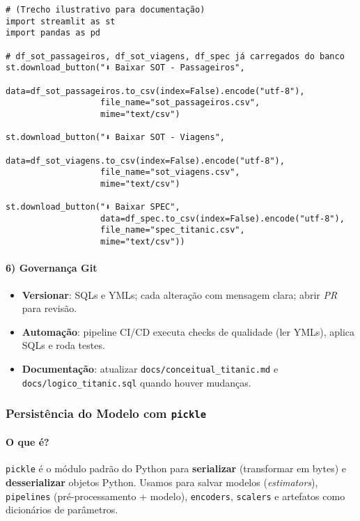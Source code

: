 \documentclass[12pt,a4paper]{article}
\begin{document}
\begin{verbatim}
# (Trecho ilustrativo para documentação)
import streamlit as st
import pandas as pd

# df_sot_passageiros, df_sot_viagens, df_spec já carregados do banco
st.download_button("⬇️ Baixar SOT - Passageiros",
                   data=df_sot_passageiros.to_csv(index=False).encode("utf-8"),
                   file_name="sot_passageiros.csv",
                   mime="text/csv")

st.download_button("⬇️ Baixar SOT - Viagens",
                   data=df_sot_viagens.to_csv(index=False).encode("utf-8"),
                   file_name="sot_viagens.csv",
                   mime="text/csv")

st.download_button("⬇️ Baixar SPEC",
                   data=df_spec.to_csv(index=False).encode("utf-8"),
                   file_name="spec_titanic.csv",
                   mime="text/csv"))
\end{verbatim}

\paragraph{6) Governança Git}
\begin{itemize}
  \item \textbf{Versionar}: SQLs e YMLs; cada alteração com mensagem clara; abrir \textit{PR} para revisão.
  \item \textbf{Automação}: pipeline CI/CD executa checks de qualidade (ler YMLs), aplica SQLs e roda testes.
  \item \textbf{Documentação}: atualizar \texttt{docs/conceitual\_titanic.md} e \texttt{docs/logico\_titanic.sql} quando houver mudanças.
\end{itemize}



\subsubsection*{Persistência do Modelo com \texttt{pickle}}

\paragraph{O que é?}
\texttt{pickle} é o módulo padrão do Python para \textbf{serializar} (transformar em bytes) e \textbf{desserializar} objetos Python. 
Usamos para salvar modelos (\textit{estimators}), \texttt{pipelines} (pré-processamento + modelo), \texttt{encoders}, \texttt{scalers} e artefatos como dicionários de parâmetros.
\end{document}
